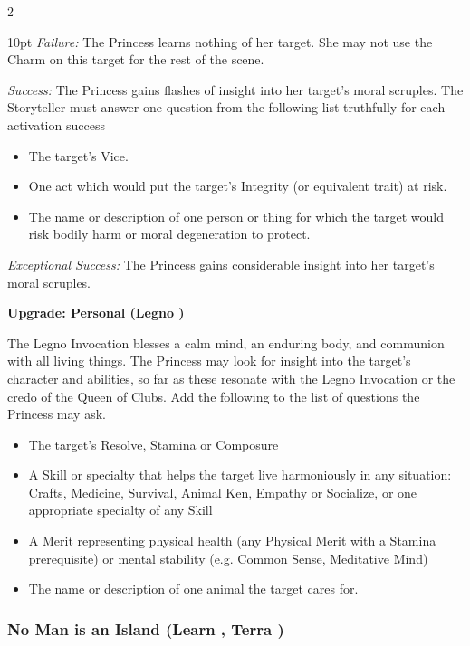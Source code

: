 \begin{multicols}{2}
\begin{myindentpar}{10pt}
\emph{Failure:} The Princess learns nothing of her target. She may not use the Charm on this target for the rest of the scene.

\emph{Success:} The Princess gains flashes of insight into her target's moral scruples. The Storyteller must answer one question from the following list truthfully for each activation success

\begin{itemize}
\item The target's Vice.
\item One act which would put the target's Integrity (or equivalent trait) at risk.
\item The name or description of one person or thing for which the target would risk bodily harm or moral degeneration to protect.
\end{itemize}

\emph{Exceptional Success:} The Princess gains considerable insight into her target's moral scruples.

\textbf{Upgrade: Personal (Legno \textbullet\textbullet)}

The Legno Invocation blesses a calm mind, an enduring body, and communion with all living things. The Princess may look for insight into the target's character and abilities, so far as these resonate with the Legno Invocation or the credo of the Queen of Clubs. Add the following to the list of questions the Princess may ask.

\begin{itemize}
 \item  The target's Resolve, Stamina or Composure
\item A Skill or specialty that helps the target live harmoniously in any situation: Crafts, Medicine, Survival, Animal Ken, Empathy or Socialize, or one appropriate specialty of any Skill
\item A Merit representing physical health (any Physical Merit with a Stamina prerequisite) or mental stability (e.g. Common Sense, Meditative Mind)
\item The name or description of one animal the target cares for.\end{itemize}\end{myindentpar}

\subsubsection*{No Man is an Island (Learn \textbullet\textbullet, Terra \textbullet)}


\end{multicols}
